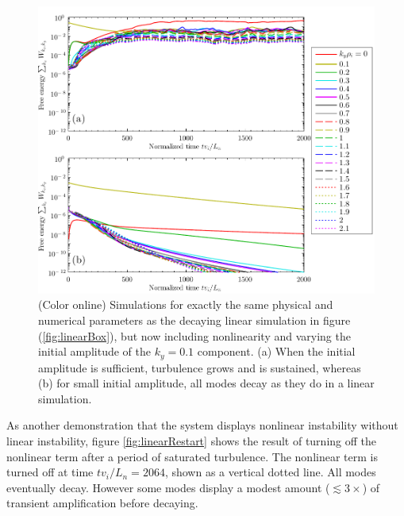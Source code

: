 \documentclass[12pt,superscriptaddress]{revtex4}
\begin{document}
\begin{figure}[h!]
\includegraphics[width=6.5in]{m20141125_02_WVsTimeForPaper_amplitudeDependence.pdf}
\caption{(Color online)
Simulations for exactly the same physical and numerical parameters as the decaying
linear simulation in figure (\ref{fig:linearBox}), but now including nonlinearity and varying the
initial amplitude of the $k_y=0.1$ component.
(a) When the initial amplitude is sufficient, turbulence grows and is sustained, whereas (b) for small initial amplitude,
all modes decay as they do in a linear simulation.
\label{fig:amplitudeDependence}}
\end{figure}

As another demonstration that the system displays nonlinear instability without linear instability,
figure \ref{fig:linearRestart} shows the result of
turning off the nonlinear term after a period of saturated turbulence.
The nonlinear term is turned off at time $t v_i / L_n = 2064$, shown as a vertical
dotted line.  All modes eventually decay.
However some modes
display a modest amount ($\lesssim 3\times$) of transient amplification before decaying.
\end{document}
